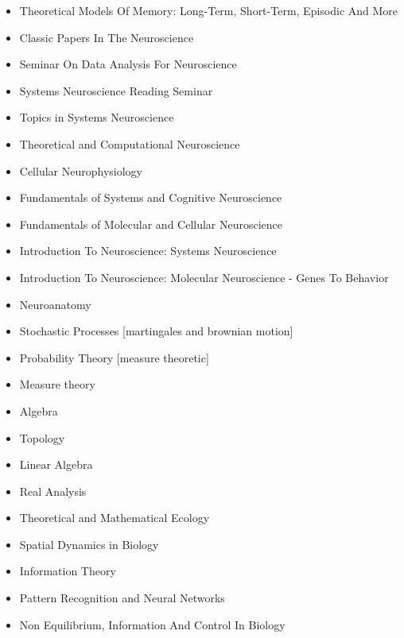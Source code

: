 
\begin{itemize}
\item Theoretical Models Of Memory: Long-Term, Short-Term, Episodic And More
\item Classic Papers In The Neuroscience
\item Seminar On Data Analysis For Neuroscience
\item Systems Neuroscience Reading Seminar
\item Topics in Systems Neuroscience
\item Theoretical and Computational Neuroscience
\item Cellular Neurophysiology
\item Fundamentals of Systems and Cognitive Neuroscience
\item Fundamentals of Molecular and Cellular Neuroscience
\item Introduction To Neuroscience: Systems Neuroscience
\item Introduction To Neuroscience: Molecular Neuroscience - Genes To Behavior
\item Neuroanatomy	
\end{itemize}

\begin{itemize}
\item Stochastic Processes {\small[martingales and brownian motion]}
\item Probability Theory {\small[measure theoretic]}
\item Measure theory
\item Algebra
\item Topology
\item Linear Algebra
\item Real Analysis
\end{itemize}

\begin{itemize}
\item Theoretical and Mathematical Ecology
\item Spatial Dynamics in Biology
\item Information Theory
\item Pattern Recognition and Neural Networks
\item Non Equilibrium, Information And Control In Biology
\end{itemize}

%
%
